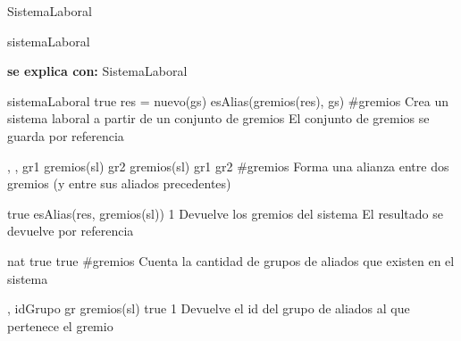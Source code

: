 \begin{interfaz}{SistemaLaboral}
\begin{iparamformales}{sistemaLaboral}

\textbf{\large se explica con:} SistemaLaboral

\end{iparamformales}

{}{sistemaLaboral}
{true}
{res = nuevo(gs) \ly esAlias(gremios(res), gs)}
{\#gremios}
{Crea un sistema laboral a partir de un conjunto de gremios}
{El conjunto de gremios se guarda por referencia}

{, , }{}
{gr1 \in gremios(sl) \ly gr2 \in gremios(sl) \ly gr1 \distinto gr2 }
{}
{\#gremios}
{Forma una alianza entre dos gremios (y entre sus aliados precedentes)}
{}

{true}
{esAlias(res, gremios(sl))}
{1}
{Devuelve los gremios del sistema}
{El resultado se devuelve por referencia}

{}{nat}
{true}
{true}
{\#gremios}
{Cuenta la cantidad de grupos de aliados que existen en el sistema}
{}

{, }{idGrupo}
{gr \in gremios(sl)}
{true}
{1}
{Devuelve el id del grupo de aliados al que pertenece el gremio}
{}

\end{interfaz}